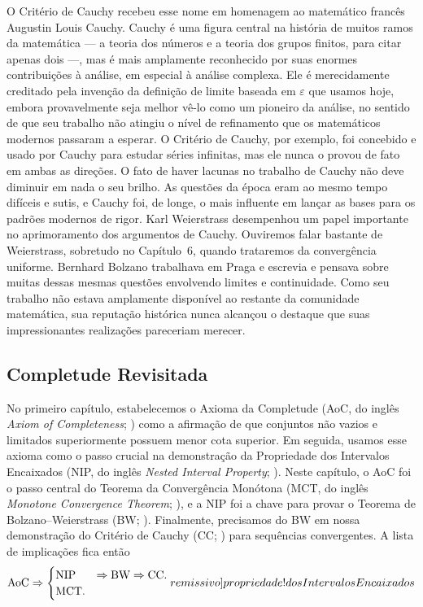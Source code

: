 O Critério de Cauchy recebeu esse nome em homenagem ao matemático francês Augustin Louis Cauchy. Cauchy é uma figura central na história de muitos ramos da matemática --- a teoria dos números e a teoria dos grupos finitos, para citar apenas dois ---, mas é mais amplamente reconhecido por suas enormes contribuições à análise, em especial à análise complexa. Ele é merecidamente creditado pela invenção da definição de limite baseada em $\varepsilon$ que usamos hoje, embora provavelmente seja melhor vê-lo como um pioneiro da análise, no sentido de que seu trabalho não atingiu o nível de refinamento que os matemáticos modernos passaram a esperar. O Critério de Cauchy, por exemplo, foi concebido e usado por Cauchy para estudar séries infinitas, mas ele nunca o provou de fato em ambas as direções. O fato de haver lacunas no trabalho de Cauchy não deve diminuir em nada o seu brilho. As questões da época eram ao mesmo tempo difíceis e sutis, e Cauchy foi, de longe, o mais influente em lançar as bases para os padrões modernos de rigor. Karl Weierstrass desempenhou um papel importante no aprimoramento dos argumentos de Cauchy. Ouviremos falar bastante de Weierstrass, sobretudo no Capítulo~6, quando trataremos da convergência uniforme. Bernhard Bolzano trabalhava em Praga e escrevia e pensava sobre muitas dessas mesmas questões envolvendo limites e continuidade. Como seu trabalho não estava amplamente disponível ao restante da comunidade matemática, sua reputação histórica nunca alcançou o destaque que suas impressionantes realizações pareceriam merecer.

\subsection{Completude Revisitada}

No primeiro capítulo, estabelecemos o Axioma da Completude (AoC, do inglês \textit{Axiom of Completeness}; ) como a afirmação de que conjuntos não vazios e limitados superiormente possuem menor cota superior. Em seguida, usamos esse axioma como o passo crucial na demonstração da Propriedade dos Intervalos Encaixados (NIP, do inglês \textit{Nested Interval Property}; ). Neste capítulo, o AoC foi o passo central do Teorema da Convergência Monótona (MCT, do inglês \textit{Monotone Convergence Theorem}; ), e a NIP foi a chave para provar o Teorema de Bolzano--Weierstrass (BW; ). Finalmente, precisamos do BW em nossa demonstração do Critério de Cauchy (CC; ) para sequências convergentes. A lista de implicações fica então  
\[
\text{AoC} \Rightarrow \begin{cases} \text{NIP} & \Rightarrow \text{BW} \Rightarrow \text{CC}. \\ \text{MCT}. \end{cases} \index[remissivo]{propriedade!dos Intervalos Encaixados}
\]

